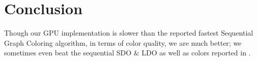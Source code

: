 \documentclass[preprint]{sigplanconf}
\begin{document}
%
%
%
%
%
%


\section{Conclusion}
Though our GPU implementation is slower than the reported fastest Sequential Graph Coloring algorithm, in terms of color quality, we are much better; we sometimes even beat the sequential SDO $\&$ LDO as well as colors reported in \cite{bozdag2008a}.
\end{document}
